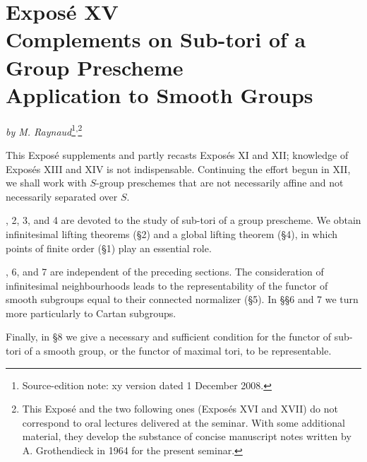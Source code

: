 

\chapter*{Exposé XV\\Complements on Sub-tori of a Group Prescheme\\
Application to Smooth Groups}

\begin{center}
\textit{by M. Raynaud}\footnote{Source-edition note: xy version dated
1 December 2008.}\textsuperscript{,}\footnote{This Exposé and the two following ones
(Exposés XVI and XVII) do not correspond to oral lectures delivered at
the seminar. With some additional material, they develop the substance
of concise manuscript notes written by A. Grothendieck in 1964 for the
present seminar.}
\end{center}


This Exposé supplements and partly recasts Exposés XI and XII; knowledge
of Exposés XIII and XIV is not indispensable. Continuing the effort
begun in XII, we shall work with \(S\)-group preschemes that are not
necessarily affine and not necessarily separated over \(S\).

, 2, 3, and 4 are devoted to the study of sub-tori of a group
prescheme. We obtain infinitesimal lifting theorems (§2) and a global
lifting theorem (§4), in which points of finite order (§1) play an
essential role.

, 6, and 7 are independent of the preceding sections. The
consideration of infinitesimal neighbourhoods leads to the
representability of the functor of smooth subgroups equal to their
connected normalizer (§5). In §§6 and 7 we turn more particularly to
Cartan subgroups.

Finally, in §8 we give a necessary and sufficient condition for the
functor of sub-tori of a smooth group, or the functor of maximal tori,
to be representable.

